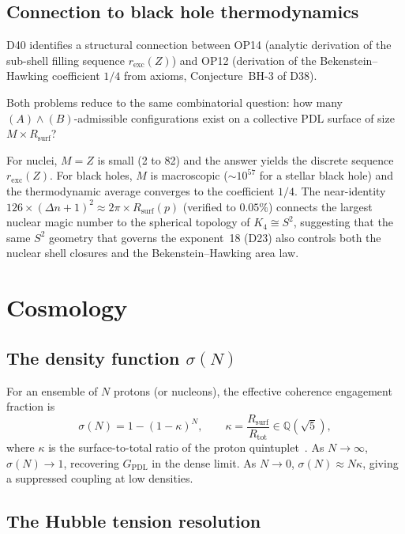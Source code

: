 \documentclass[11pt,a4paper]{article}
\theoremstyle{plain}
\theoremstyle{definition}
\theoremstyle{remark}
\newcommand{\GPDL}{G_{\mathrm{PDL}}}
\newcommand{\Rsurf}{R_{\mathrm{surf}}}
\newcommand{\Rtot}{R_{\mathrm{tot}}}
\begin{document}
\subsection{Connection to black hole thermodynamics}
\label{subsec:nuclear_bh_connection}

D40 identifies a structural connection between OP14 (analytic derivation of the sub-shell filling sequence $r_{\mathrm{exc}}(Z)$) and OP12 (derivation of the Bekenstein--Hawking coefficient $1/4$ from axioms, Conjecture~BH-3 of D38).

Both problems reduce to the same combinatorial question: how many $(A)\wedge(B)$-admissible configurations exist on a collective PDL surface of size $M \times \Rsurf$?

For nuclei, $M = Z$ is small (2 to 82) and the answer yields the discrete sequence $r_{\mathrm{exc}}(Z)$.
For black holes, $M$ is macroscopic ($\sim 10^{57}$ for a stellar black hole) and the thermodynamic average converges to the coefficient $1/4$.
The near-identity $126 \times (\Delta n+1)^2 \approx 2\pi \times \Rsurf(p)$ (verified to $0.05\%$) connects the largest nuclear magic number to the spherical topology of $K_4 \cong S^2$, suggesting that the same $S^2$ geometry that governs the exponent~18 (D23) also controls both the nuclear shell closures and the Bekenstein--Hawking area law.

\section{Cosmology}
\label{sec:cosmology}

\subsection{The density function \texorpdfstring{$\sigma(N)$}{sigma(N)}}
\label{subsec:sigma}

For an ensemble of $N$ protons (or nucleons), the effective coherence engagement fraction is
\[
\sigma(N) = 1 - (1-\kappa)^N, \qquad \kappa = \frac{\Rsurf}{\Rtot} \in \mathbb{Q}(\sqrt{5}),
\]
where $\kappa$ is the surface-to-total ratio of the proton quintuplet~\citep{D24,D26}.
As $N\to\infty$, $\sigma(N)\to 1$, recovering $\GPDL$ in the dense limit.
As $N\to 0$, $\sigma(N)\approx N\kappa$, giving a suppressed coupling at low densities.

\subsection{The Hubble tension resolution}
\label{subsec:hubble}
\end{document}
